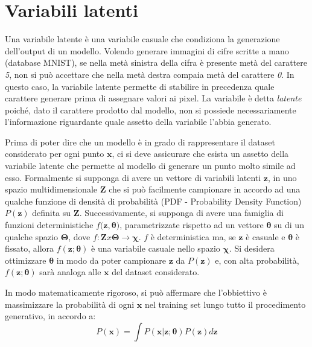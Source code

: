 \section{Variabili latenti} %
\label{sec:variabili_latenti}
Una variabile latente è una variabile casuale che condiziona la generazione dell'output di un modello. Volendo generare immagini di cifre scritte a mano (database MNIST), se nella metà sinistra della cifra è presente metà del carattere \textit{5}, non si può accettare che nella metà destra compaia metà del carattere \textit{0}. In questo caso, la variabile latente permette di stabilire in precedenza quale carattere generare prima di assegnare valori ai pixel. La variabile è detta \textit{latente} poiché, dato il carattere prodotto dal modello, non si possiede necessariamente l'informazione riguardante quale assetto della variabile l'abbia generato.

Prima di poter dire che un modello è in grado di rappresentare il dataset considerato per ogni punto $\boldsymbol{x}$, ci si deve assicurare che esista un assetto della variabile latente che permette al modello di generare un punto molto simile ad esso. Formalmente si supponga di avere un vettore di variabili latenti $\boldsymbol{z}$, in uno spazio multidimensionale $\boldsymbol{Z}$ che si può facilmente campionare in accordo ad una qualche funzione di densità di probabilità (PDF - Probability Density Function) $P(\boldsymbol{z})$ definita su $\boldsymbol{Z}$. Successivamente, si supponga di avere una famiglia di funzioni deterministiche $f(\boldsymbol{z}, \boldsymbol{\theta)}$, parametrizzate rispetto ad un vettore $\boldsymbol{\theta}$ su di un qualche spazio $\boldsymbol{\Theta}$, dove $f : \boldsymbol{Z} x \boldsymbol{\Theta} \rightarrow \boldsymbol{\chi}$. $f$ è deterministica ma, se $\boldsymbol{z}$ è casuale e $\boldsymbol{\theta}$ è fissato, allora $f(\boldsymbol{z}; \boldsymbol{\theta})$ è una variabile casuale nello spazio $\boldsymbol{\chi}$. Si desidera ottimizzare $\boldsymbol{\theta}$ in modo da poter campionare $\boldsymbol{z}$ da $P(\boldsymbol{z})$ e, con alta probabilità, $f(\boldsymbol{z}; \boldsymbol{\theta})$ sarà analoga alle $\boldsymbol{x}$ del dataset considerato.

In modo matematicamente rigoroso, si può affermare che l'obbiettivo è massimizzare la probabilità di ogni $\boldsymbol{x}$ nel training set lungo tutto il procedimento generativo, in accordo a:
\begin{equation}
	\label{probability}
	P(\boldsymbol{x}) = \int P(\boldsymbol{x} | \boldsymbol{z}; \boldsymbol{\theta}) P(\boldsymbol{z})d\boldsymbol{z}
\end{equation}

